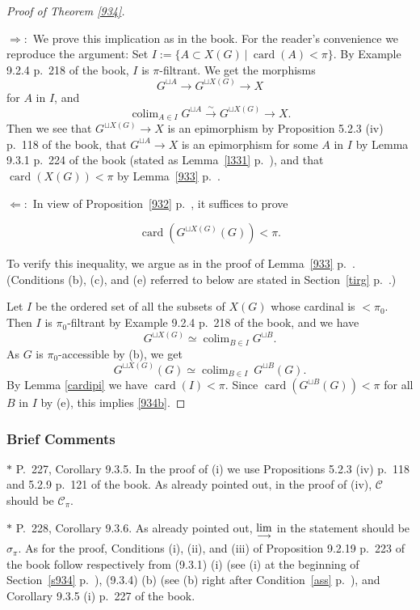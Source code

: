 \documentclass[12pt]{article}%
\theoremstyle{remark}
\theoremstyle{definition}
\newcommand{\nn}{\noindent}
\newcommand{\C}{\mathcal C}
\newcommand{\si}{\Leftarrow}
\newcommand{\then}{\Rightarrow}
\newcommand{\xr}{\xrightarrow}
\newcommand{\ilim}{\operatornamewithlimits{\underset{\longrightarrow}{lim}}}
\DeclareMathOperator*{\colim}{colim}%
\DeclareMathOperator{\card}{card}%
\begin{document}
\begin{proof}[Proof of Theorem \ref{934}]${}$

\nn$\then:$ We prove this implication as in the book. For the reader's convenience we reproduce the argument: Set $I:=\{A\subset X(G)\ |\ \card(A)<\pi\}$. By Example 9.2.4 p.~218 of the book, $I$ is $\pi$-filtrant. We get the morphisms 
$$
G^{\sqcup A}\to G^{\sqcup X(G)}\to X
$$ 
for $A$ in $I$, and 
$$
\colim_{A\in I}G^{\sqcup A}\xr\sim G^{\sqcup X(G)}\to X.
$$ 
Then we see that $G^{\sqcup X(G)}\to X$ is an epimorphism by Proposition 5.2.3 (iv) p.~118 of the book, that $G^{\sqcup A}\to X$ is an epimorphism for some $A$ in $I$ by Lemma 9.3.1 p.~224 of the book (stated as Lemma~\ref{l331} p.~\pageref{l331}), and that $\card(X(G))<\pi$ by Lemma~\ref{933} p.~\pageref{933}.

\nn$\si:$ In view of Proposition~\ref{932} p.~\pageref{932}, it suffices to prove  

\begin{equation}\label{934b}
\card(G^{\sqcup X(G)}(G))<\pi.
\end{equation} 

To verify this inequality, we argue as in the proof of Lemma~\ref{933} p.~\pageref{933}. (Conditions (b), (c), and (e) referred to below are stated in Section~\ref{tirg} p.~\pageref{tirg}.)

Let $I$ be the ordered set of all the subsets of $X(G)$ whose cardinal is $<\pi_0$. Then $I$ is $\pi_0$-filtrant by Example 9.2.4 p.~218 of the book, and we have 
$$
G^{\sqcup X(G)}\simeq\colim_{B\in I}G^{\sqcup B}.
$$ 
As $G$ is $\pi_0$-accessible by (b), we get 
$$
G^{\sqcup X(G)}(G)\simeq\colim_{B\in I}\ G^{\sqcup B}(G).
$$ 
By Lemma \ref{cardipi} we have $\card(I)<\pi$. Since $\card(G^{\sqcup B}(G))<\pi$ for all $B$ in $I$ by (e), this implies \eqref{934b}.
\end{proof}

\subsubsection{Brief Comments}

\nn$*$ P.~227, Corollary 9.3.5. In the proof of (i) we use Propositions 5.2.3 (iv) p.~118 and 5.2.9 p.~121 of the book. As already pointed out, in the proof of (iv), $\C$ should be $\C_\pi$. 

\nn$*$ P.~228, Corollary 9.3.6. As already pointed out, $\ilim$ in the statement should be $\sigma_\pi$. As for the proof, Conditions (i), (ii), and (iii) of Proposition 9.2.19 p.~223 of the book follow respectively from (9.3.1) (i) (see (i) at the beginning of Section~\ref{s934} p.~\pageref{s934}), (9.3.4) (b) (see (b) right after Condition~\ref{ass} p.~\pageref{ass}), and Corollary 9.3.5 (i) p.~227 of the book. 
\end{document}
